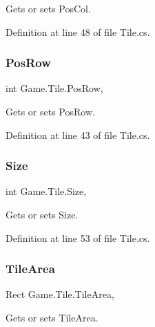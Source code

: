 Gets or sets Pos\+Col. 



Definition at line 48 of file Tile.\+cs.

\mbox{\label{class_game_1_1_tile_adb77ee78f3f25dcf4777d1b6531edd97}} 
\subsubsection{\texorpdfstring{PosRow}{PosRow}}
{\footnotesize\ttfamily int Game.\+Tile.\+Pos\+Row\hspace{0.3cm}{\ttfamily [get]}, {\ttfamily [set]}}



Gets or sets Pos\+Row. 



Definition at line 43 of file Tile.\+cs.

\mbox{\label{class_game_1_1_tile_abc440773425014636b7460a55cc93983}} 
\subsubsection{\texorpdfstring{Size}{Size}}
{\footnotesize\ttfamily int Game.\+Tile.\+Size\hspace{0.3cm}{\ttfamily [get]}, {\ttfamily [set]}}



Gets or sets Size. 



Definition at line 53 of file Tile.\+cs.

\mbox{\label{class_game_1_1_tile_ad17074956833912d06a9539a4b41d24e}} 
\subsubsection{\texorpdfstring{TileArea}{TileArea}}
{\footnotesize\ttfamily Rect Game.\+Tile.\+Tile\+Area\hspace{0.3cm}{\ttfamily [get]}, {\ttfamily [set]}}



Gets or sets Tile\+Area. 



